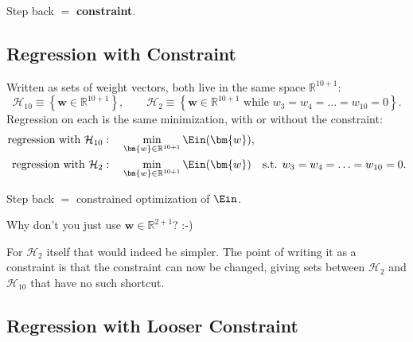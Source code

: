 \begin{moral}
    Step back \(=\) \textbf{constraint}.
\end{moral}

\subsection{Regression with Constraint}

Written as sets of weight vectors, both live in the same space
\(\mathbb{R}^{10+1}\):
\[
    \mathcal{H}_{10} \equiv \left\{ \bm{w} \in \mathbb{R}^{10+1} \right\} ,
    \qquad
    \mathcal{H}_2 \equiv \left\{ \bm{w} \in \mathbb{R}^{10+1} \text{ while }
    w_3 = w_4 = \ldots = w_{10} = 0 \right\} .
\]
Regression on each is the same minimization, with or without the constraint:
\begin{align*}
    \text{regression with } \mathcal{H}_{10}&: \quad \min_{\bm{w} \in
    \mathbb{R}^{10+1}} \Ein(\bm{w}) ,\\
    \text{regression with } \mathcal{H}_2&: \quad \min_{\bm{w} \in
    \mathbb{R}^{10+1}} \Ein(\bm{w}) \quad \text{s.t. } w_3 = w_4 = \ldots =
    w_{10} = 0 .
\end{align*}

\begin{moral}
    Step back \(=\) constrained optimization of \(\Ein\).
\end{moral}

\begin{question}
    Why don't you just use \(\bm{w} \in \mathbb{R}^{2+1}\)? :-)
\end{question}

For \(\mathcal{H}_2\) itself that would indeed be simpler. The point of
writing it as a constraint is that the constraint can now be changed, giving
sets between \(\mathcal{H}_2\) and \(\mathcal{H}_{10}\) that have no such
shortcut.

\subsection{Regression with Looser Constraint}

